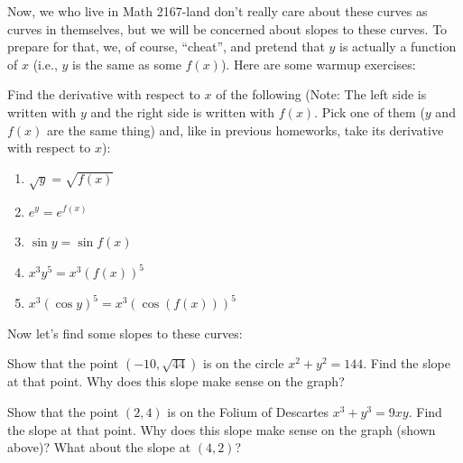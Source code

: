 \documentclass[handout]{ximera}
\begin{document}
Now, we who live in Math 2167-land don't really care about these curves as curves in themselves, but we will be concerned about slopes to these curves.  To prepare for that, we, of course, ``cheat'', and pretend that $y$ is actually a function of $x$ (i.e., $y$ is the same as some $f(x)$).  Here are some warmup exercises:

\begin{exercise} 
Find the derivative with respect to $x$ of the following (Note: The left side is written with $y$ and the right side is written with $f(x)$.  Pick one of them ($y$ and $f(x)$ are the same thing) and, like in previous homeworks, take its derivative with respect to $x$):
\begin{enumerate}
    \item $\sqrt{y} = \sqrt{f(x)}$
    \item $e^y = e^{f(x)}$
    \item $\sin y = \sin f(x)$
    \item $x^3y^5 = x^3(f(x))^5$
    \item $x^3 (\cos y)^5 = x^3(\cos (f(x)))^5$
\end{enumerate}
\end{exercise}
        Now let’s find some slopes to these curves:
\begin{exercise} 
Show that the point $(-10,  \sqrt{44})$ is on the circle  $x^2 + y^2 = 144$.  Find the slope at that point.  Why does this slope make sense on the graph?
\end{exercise}
\begin{exercise} 
Show that the point $(2, 4)$ is on the Folium of Descartes  $x^3+y^3=9xy$.  Find the slope at that point.  Why does this slope make sense on the graph (shown above)?  What about the slope at $(4,2)$?
\end{exercise}
\end{document}
